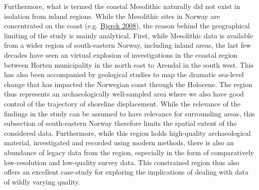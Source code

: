 \documentclass[
  12pt,
  a4paper,
  oneside]{book}
\begin{document}
Furthermore, what is termed the coastal Mesolithic naturally did not exist in isolation from inland regions. While the Mesolithic sites in Norway are concentrated on the coast (e.g. \protect\hyperlink{ref-bjerck2008}{Bjerck 2008}), the reason behind the geographical limiting of the study is mainly analytical. First, while Mesolithic data is available from a wider region of south-eastern Norway, including inland areas, the last few decades have seen an virtual explosion of investigations in the coastal region between Horten municipality in the north east to Arendal in the south west. This has also been accompanied by geological studies to map the dramatic sea-level change that has impacted the Norwegian coast through the Holocene. The region thus represents an archaeologically well-sampled area where we also have good control of the trajectory of shoreline displacement. While the relevance of the findings in the study can be assumed to have relevance for surrounding areas, this subsection of south-eastern Norway therefore limits the spatial extent of the considered data. Furthermore, while this region holds high-quality archaeological material, investigated and recorded using modern methods, there is also an abundance of legacy data from the region, especially in the form of comparatively low-resolution and low-quality survey data. This constrained region thus also offers an excellent case-study for exploring the implications of dealing with data of wildly varying quality.
\end{document}
